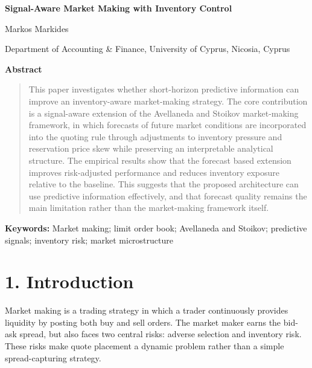 \documentclass[12pt,a4paper]{article}
\let\originalsection\section
\renewcommand{\section}{\clearpage\originalsection}
\begin{document}
\begin{titlepage}
\thispagestyle{empty}
\centering
\vspace*{3cm}
{\LARGE\bfseries Signal-Aware Market Making with Inventory Control\par}
\vspace{1.5cm}
{\large Markos Markides\par}
\vspace{0.4cm}
{\normalsize Department of Accounting \& Finance, University of Cyprus,
Nicosia, Cyprus\par}
\vfill
\end{titlepage}

\clearpage
\thispagestyle{plain}
\begin{center}
{\Large\bfseries Abstract\par}
\end{center}
\vspace{0.5em}
\begin{quote}
This paper investigates whether short-horizon predictive information can
improve an inventory-aware market-making strategy. The core contribution
is a signal-aware extension of the Avellaneda and Stoikov market-making
framework, in which forecasts of future market conditions are
incorporated into the quoting rule through adjustments to inventory
pressure and reservation price skew while preserving an interpretable
analytical structure. The empirical results show that the forecast based
extension improves risk-adjusted performance and reduces inventory
exposure relative to the baseline. This suggests that the proposed
architecture can use predictive information effectively, and that
forecast quality remains the main limitation rather than the
market-making framework itself.
\end{quote}
\vspace{1em}
\noindent\textbf{Keywords:} Market making; limit order book; Avellaneda
and Stoikov; predictive signals; inventory risk; market microstructure

\section{1. Introduction}\label{introduction}

Market making is a trading strategy in which a trader continuously
provides liquidity by posting both buy and sell orders. The market maker
earns the bid-ask spread, but also faces two central risks: adverse
selection and inventory risk. These risks make quote placement a dynamic
problem rather than a simple spread-capturing strategy.
\end{document}
